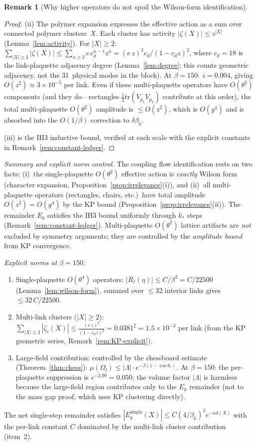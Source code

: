 \documentclass[11pt]{article}
\theoremstyle{definition}
\newtheorem{remark}[theorem]{Remark}
\newcommand{\tr}{\mathrm{tr}}
\begin{document}
\begin{remark}[Why higher operators do not spoil the Wilson-form identification]
\begin{proof}
(ii) The polymer expansion expresses the effective action as a
sum over connected polymer clusters~$X$.  Each cluster has activity
$|\zeta(X)|\le z^{|X|}$ (Lemma~\ref{lem:activity}).  For $|X|\ge 2$:
$\sum_{|X|\ge 2}|\zeta(X)|\le\sum_{n\ge 2}e\,c_d^{n-1}z^n
=(e\,z)^2c_d/(1-c_d z)^2$,
where $c_d=18$ is the link-plaquette adjacency degree
(Lemma~\ref{lem:degree}; this counts geometric adjacency,
not the 31~physical modes in the block).
At $\beta=150$: $z=0.004$, giving $O(z^2)\approx 3\times 10^{-5}$
per link.  Even if these multi-plaquette operators have
$O(\theta^2)$ components (and they do---rectangles
$\frac{1}{2}\tr(V_{p_1}V_{p_2})$ contribute at this order),
the total multi-plaquette $O(\theta^2)$ amplitude is $\le O(z^2)$,
which is $O(g^4)$ and is absorbed into the $O(1/\beta)$
correction to $\delta\beta_k$.

(iii) is the IH3 inductive bound, verified at each scale with
the explicit constants in Remark~\ref{rem:constant-ledger}.
\end{proof}

\emph{Summary and explicit norm control.}
The coupling flow identification rests on two facts:
(i)~the single-plaquette $O(\theta^2)$ effective action is
\emph{exactly} Wilson form (character expansion,
Proposition~\ref{prop:irrelevance}(i)), and
(ii)~all multi-plaquette operators (rectangles, chairs, etc.)\
have total amplitude $O(z^2)=O(g^4)$ by the KP bound
(Proposition~\ref{prop:irrelevance}(ii)).
The remainder $E_k$ satisfies the IH3 bound uniformly
through $k_*$ steps (Remark~\ref{rem:constant-ledger}).
Multi-plaquette $O(\theta^2)$ lattice artifacts are
\emph{not} excluded by symmetry arguments; they are
controlled by the \emph{amplitude bound} from KP convergence.

\emph{Explicit norms at $\beta=150$:}
\begin{enumerate}[nosep]
\item Single-plaquette $O(\theta^4)$ operators:
$|R_\ell(\eta)|\le C/\beta^2=C/22500$
(Lemma~\ref{lem:wilson-form}), summed over $\le 32$
interior links gives
$\le 32\,C/22500$.
\item Multi-link clusters ($|X|\ge 2$):
$\sum_{|X|\ge 2}|\zeta_c(X)|\le\frac{(e\,z)^2}{(1-c_d z)^2}
=0.0381^2=1.5\times 10^{-3}$
per link (from the KP geometric series,
Remark~\ref{rem:KP-explicit}).
\item Large-field contribution:
controlled by the chessboard estimate
(Theorem~\ref{thm:chess}):
$\mu(\Omega_l)\le|\Lambda|\cdot e^{-\beta(1-\cos\theta_*)}$.
At $\beta=150$: the per-plaquette suppression is
$e^{-2.99}=0.050$; the volume factor $|\Lambda|$ is
harmless because the large-field region contributes only to
the $E_k$ remainder (not to the mass gap proof, which uses
KP clustering directly).
\end{enumerate}
The net single-step remainder satisfies
$|E_k^{\mathrm{single}}(X)|\le C(4/\beta_k)^2 e^{-\kappa d(X)}$
with the per-link constant $C$ dominated by the
multi-link cluster contribution (item~2).


\end{remark}
\end{document}
